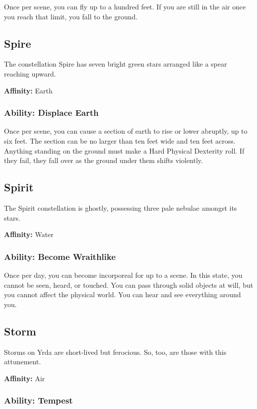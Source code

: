 \begin{multicols}{2}
Once per scene, you can fly up to a hundred feet. If you are
still in the air once you reach that limit, you fall to the ground.

\subsection{Spire}

The constellation Spire has seven bright green stars arranged
like a spear reaching upward.

\textbf{Affinity:} Earth

\subsubsection{Ability: Displace Earth}

Once per scene, you can cause a section of earth to rise or lower
abruptly, up to six feet. The section can be no larger than ten
feet wide and ten feet across. Anything standing on the ground
must make a Hard Physical Dexterity roll. If they fail, they fall
over as the ground under them shifts violently.

\subsection{Spirit}

The Spirit constellation is ghostly, possessing three pale nebulae amongst
its stars.

\textbf{Affinity:} Water

\subsubsection{Ability: Become Wraithlike}

Once per day, you can become incorporeal for up to a scene. In this state,
you cannot be seen, heard, or touched. You can pass through solid objects
at will, but you cannot affect the physical world. You can hear and see
everything around you.

\subsection{Storm}

Storms on Yrda are short-lived but ferocious. So, too, are those
with this attunement.

\textbf{Affinity:} Air

\subsubsection{Ability: Tempest}


\end{multicols}
